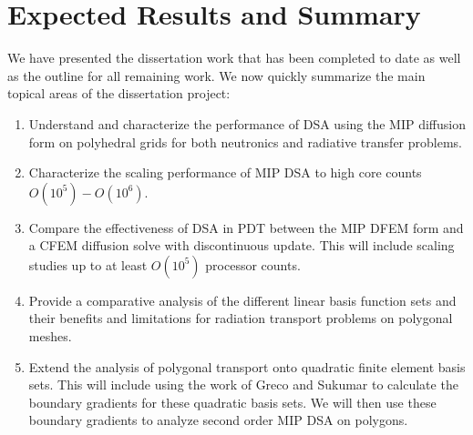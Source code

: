 \documentclass[11pt]{article}
\begin{document}
\section{Expected Results and Summary}
\label{sec::ER}

We have presented the dissertation work that has been completed to date as well as the outline for all remaining work. We now quickly summarize the main topical areas of the dissertation project:

\begin{enumerate}
	\item Understand and characterize the performance of DSA using the MIP diffusion form on polyhedral grids for both neutronics and radiative transfer problems.
	\item Characterize the scaling performance of MIP DSA to high core counts $O(10^5) - O(10^6)$.
	\item Compare the effectiveness of DSA in PDT between the MIP DFEM form and a CFEM diffusion solve with discontinuous update. This will include scaling studies up to at least $O(10^5)$ processor counts.
	\item Provide a comparative analysis of the different linear basis function sets and their benefits and limitations for radiation transport problems on polygonal meshes.
	\item Extend the analysis of polygonal transport onto quadratic finite element basis sets. This will include using the work of Greco and Sukumar \cite{greco2013derivatives} to calculate the boundary gradients for these quadratic basis sets. We will then use these boundary gradients to analyze second order MIP DSA on polygons.
\end{enumerate}



\end{document}
